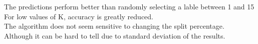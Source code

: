 The predictions perform better than randomly selecting a lable between 1 and 15\\
For low values of K, accuracy is greatly reduced.  \\
The algorithm does not seem sensitive to changing the split percentage. \\
Although it can be hard to tell due to standard deviation of the results. \\

